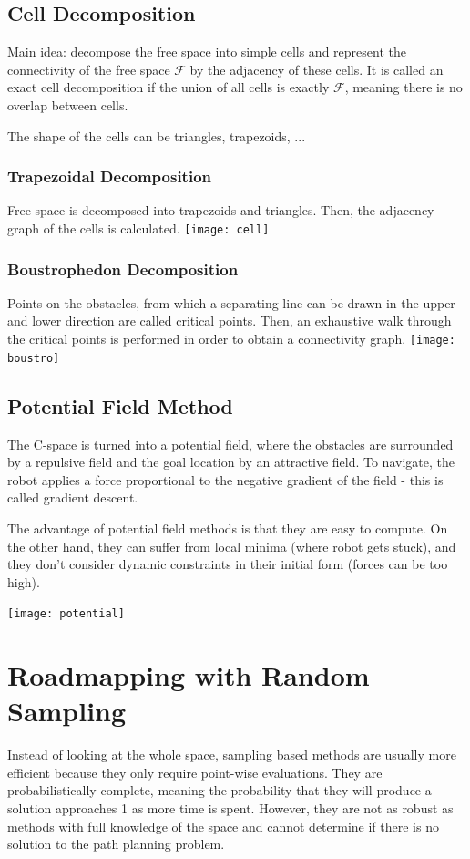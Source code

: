 \begin{multicols*}{2}
\subsection{Cell Decomposition}
Main idea: decompose the free space into simple cells and represent the connectivity of the free space $\mathcal{F}$ by the adjacency of these cells. It is called an exact cell decomposition if the union of all cells is exactly $\mathcal{F}$, meaning there is no overlap between cells. 

The shape of the cells can be triangles, trapezoids, ...

\subsubsection{Trapezoidal Decomposition}
Free space is decomposed into trapezoids and triangles. Then, the adjacency graph of the cells is calculated.
\texttt{[image: cell]}

\subsubsection{Boustrophedon Decomposition}
Points on the obstacles, from which a separating line can be drawn in the upper and lower direction are called critical points. Then, an exhaustive walk through the critical points is performed in order to obtain a connectivity graph.
\texttt{[image: boustro]}

\subsection{Potential Field Method}
The C-space is turned into a potential field, where the obstacles are surrounded by a repulsive field and the goal location by an attractive field. To navigate, the robot applies a force proportional to the negative gradient of the field - this is called gradient descent. 

The advantage of potential field methods is that they are easy to compute. On the other hand, they can suffer from local minima (where robot gets stuck), and they don't consider dynamic constraints in their initial form (forces can be too high).

\texttt{[image: potential]}


\section{Roadmapping with Random Sampling}
Instead of looking at the whole space, sampling based methods are usually more efficient because they only require point-wise evaluations. They are probabilistically complete, meaning the probability that they will produce a solution approaches 1 as more time is spent. However, they are not as robust as methods with full knowledge of the space and cannot determine if there is no solution to the path planning problem.


\end{multicols*}
